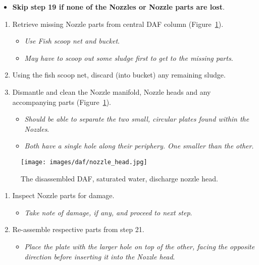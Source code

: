 \documentclass[
  letterpaper,
  DIV=11,
  numbers=noendperiod]{scrreprt}
\providecommand{\tightlist}{%
  \setlength{\itemsep}{0pt}\setlength{\parskip}{0pt}}\usepackage{longtable,booktabs,array}
\begin{document}
\begin{itemize}
\tightlist
\item
  \textbf{Skip step 19 if none of the Nozzles or Nozzle parts are lost}.
\end{itemize}

\begin{enumerate}
\def\labelenumi{\arabic{enumi}.}
\setcounter{enumi}{18}
\tightlist
\item
  Retrieve missing Nozzle parts from central DAF column
  (Figure~\ref{fig-dafnozzle}).

  \begin{itemize}
  \tightlist
  \item
    \emph{Use Fish scoop net and bucket}.
  \item
    \emph{May have to scoop out some sludge first to get to the missing
    parts}.
  \end{itemize}
\item
  Using the fish scoop net, discard (into bucket) any remaining sludge.
\item
  Dismantle and clean the Nozzle manifold, Nozzle heads and any
  accompanying parts (Figure~\ref{fig-dafnozzle}).

  \begin{itemize}
  \tightlist
  \item
    \emph{Should be able to separate the two small, circular plates
    found within the Nozzles}.
  \item
    \emph{Both have a single hole along their periphery. One smaller
    than the other}.
  \end{itemize}
\end{enumerate}

\begin{figure}[H]

{\centering \texttt{[image: images/daf/nozzle\_head.jpg]}

}

\caption{\label{fig-dafnozzle}The disassembled DAF, saturated water,
discharge nozzle head.}

\end{figure}

\begin{enumerate}
\def\labelenumi{\arabic{enumi}.}
\setcounter{enumi}{21}
\tightlist
\item
  Inspect Nozzle parts for damage.

  \begin{itemize}
  \tightlist
  \item
    \emph{Take note of damage, if any, and proceed to next step}.
  \end{itemize}
\item
  Re-assemble respective parts from step 21.

  \begin{itemize}
  \tightlist
  \item
    \emph{Place the plate with the larger hole on top of the other,
    facing the opposite direction before inserting it into the Nozzle
    head}.
  \end{itemize}
\end{enumerate}
\end{document}
